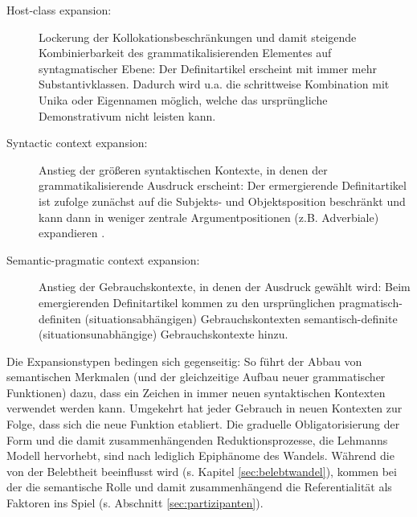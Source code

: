 \begin{description}
\item[Host-class expansion:] Lockerung der Kollokationsbeschränkungen und damit steigende Kombinierbarkeit des grammatikalisierenden Elementes auf syntagmatischer Ebene: Der Definitartikel erscheint mit immer mehr Substantivklassen. Dadurch wird u.a. die schrittweise Kombination mit Unika oder Eigennamen möglich, welche das ursprüngliche Demonstrativum nicht leisten kann. 
\item[Syntactic context expansion:] Anstieg der größeren syntaktischen Kontexte, in denen der grammatikalisierende Ausdruck erscheint: Der ermergierende Definitartikel ist \textcite[32]{Himmelmann2004} zufolge zunächst auf die Subjekts- und Objektsposition beschränkt und kann dann in weniger zentrale Argumentpositionen (z.B. Adverbiale) expandieren \parencite[s. hierzu auch][]{Himmelmann1998}. 
\item[Semantic-pragmatic context expansion:] Anstieg der Gebrauchskontexte, in denen der Ausdruck gewählt wird: Beim emergierenden Definitartikel kommen zu den ursprünglichen pragmatisch-definiten
(situationsabhängigen) Gebrauchskontexten semantisch-definite (situationsunabhängige) Gebrauchskontexte hinzu.
\end{description}

\noindent
Die Expansionstypen bedingen sich gegenseitig: So führt der Abbau von semantischen Merkmalen (und der gleichzeitige Aufbau neuer grammatischer Funktionen) dazu, dass ein Zeichen in immer neuen syntaktischen Kontexten verwendet werden kann. Umgekehrt hat jeder Gebrauch in neuen Kontexten zur Folge, dass sich die neue Funktion etabliert. Die graduelle Obligatorisierung der Form und die damit zusammenhängenden Reduktionsprozesse, die Lehmanns Modell hervorhebt, sind nach \textcite[33]{Himmelmann2004} lediglich Epiphänome des Wandels. Während die  von der Belebtheit beeinflusst wird (s. Kapitel \ref{sec:belebtwandel}), kommen bei der  die semantische Rolle und damit zusammenhängend die Referentialität als Faktoren ins Spiel (s. Abschnitt \ref{sec:partizipanten}).

